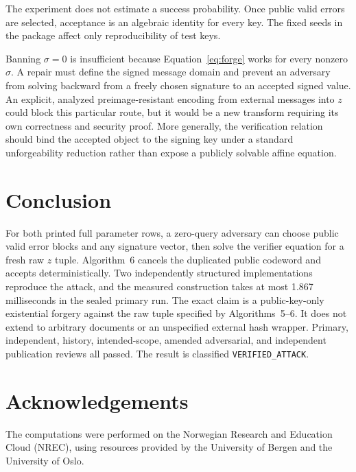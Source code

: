 \documentclass[10pt,a4paper]{article}
\begin{document}
The experiment does not estimate a success probability.  Once public valid
errors are selected, acceptance is an algebraic identity for every key.  The
fixed seeds in the package affect only reproducibility of test keys.

Banning $\sigma=0$ is insufficient because Equation~\eqref{eq:forge} works
for every nonzero $\sigma$.  A repair must define the signed message domain
and prevent an adversary from solving backward from a freely chosen signature
to an accepted signed value.  An explicit, analyzed preimage-resistant
encoding from external messages into $z$ could block this particular route,
but it would be a new transform requiring its own correctness and security
proof.  More generally, the verification relation should bind the accepted
object to the signing key under a standard unforgeability reduction rather
than expose a publicly solvable affine equation.

\section{Conclusion}

For both printed full parameter rows, a zero-query adversary can choose public
valid error blocks and any signature vector, then solve the verifier equation
for a fresh raw $z$ tuple.  Algorithm~6 cancels the duplicated public
codeword and accepts deterministically.  Two independently structured
implementations reproduce the attack, and the measured construction takes at
most 1.867 milliseconds in the sealed primary run.  The exact claim is a
public-key-only existential forgery against the raw tuple specified by
Algorithms~5--6.  It does not extend to arbitrary documents or an unspecified
external hash wrapper.  Primary, independent, history, intended-scope,
amended adversarial, and independent publication reviews all passed.  The
result is classified \texttt{VERIFIED\_ATTACK}.

\section*{Acknowledgements}
The computations were performed on the Norwegian Research and Education Cloud (NREC), using resources provided by the University of Bergen and the University of Oslo.
\end{document}

